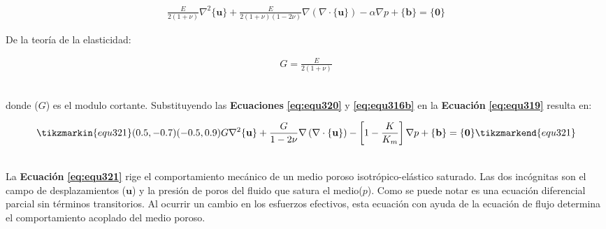 \begin{ceqn} %
\begin{gather}\label{eq:equ319}
\frac{E}{2(1+\nu)}\nabla^2 \{\mathbf{u}\}
+\frac{E}{2(1+\nu)(1-2\nu)} \nabla\left( \nabla \cdot \{\mathbf{u}\}\right)
- \alpha\nabla p + \{\mathbf{b}\} = \{\mathbf{0}\} 
\end{gather}   
\end{ceqn}

De la teoría de la elasticidad:
\begin{ceqn} %
\begin{gather}\label{eq:equ320}
G=\frac{E}{2(1+\nu)}
\end{gather}   
\end{ceqn}
\\
donde ($G$) es el modulo cortante. Substituyendo las \textbf{Ecuaciones} \textbf{\ref{eq:equ320}} y \textbf{\ref{eq:equ316b}} en la \textbf{Ecuación} \textbf{\ref{eq:equ319}} resulta en:
\bigskip

\begin{ceqn} %
\begin{gather}\label{eq:equ321}
\tikzmarkin{equ321}(0.5,-0.7)(-0.5,0.9)
G\nabla^2 \{\mathbf{u}\}
+\frac{G}{1-2\nu} \nabla\left( \nabla\cdot \{\mathbf{u}\}\right)
- \left[1-\frac{K}{K_m}\right]\nabla p + \{\mathbf{b}\} = \{\mathbf{0}\}
\tikzmarkend{equ321}
\end{gather}   
\end{ceqn}
\\
La \textbf{Ecuación} \textbf{\ref{eq:equ321}} rige el comportamiento mecánico de un medio poroso isotrópico-elástico saturado. Las dos incógnitas son el campo de desplazamientos ($\mathbf{u}$) y la presión de poros del fluido que satura el medio($p$). Como se puede notar es una ecuación diferencial parcial sin términos transitorios. Al ocurrir un cambio en los esfuerzos efectivos, esta ecuación con ayuda de la ecuación de flujo determina el comportamiento acoplado del medio poroso.\bigskip



